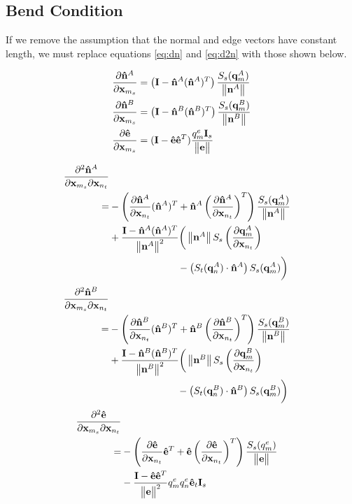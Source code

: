 \documentclass[twocolumn]{article}
\newcommand{\twocolumnonly}[1]{#1}
\newcommand{\twocolbreak}{\twocolumnonly{\notag \\}}
\newcommand{\twocolbreakal}{\twocolumnonly{\notag \\&}}
\newcommand{\norm}[1]{\begin{Vmatrix}#1\end{Vmatrix}}
\newcommand{\pfrac}[2]{
    \frac{\partial #1}{\partial #2}
}
\newcommand{\pfractwo}[3]{
    \frac{\partial^2 #1}{\partial #2 \partial #3}
}
\newcommand{\I}{{\bf I}}
\newcommand{\Is}{{\bf I}_s}
\newcommand{\x}{{\bf x}}
\newcommand{\xms}{\x_{m_s}}
\newcommand{\xnt}{\x_{n_t}}
\newcommand{\n}{{\bf n}}
\newcommand{\nhat}{{\bf {\hat n}}}
\newcommand{\e}{{\bf e}}
\newcommand{\ehat}{{\bf {\hat e}}}
\newcommand{\q}{{\bf q}}
\begin{document}
\subsection{Bend Condition}

If we remove the assumption that the normal and edge vectors have constant
length, we must replace equations \eqref{eq:dn} and \eqref{eq:d2n} with
those shown below.

\begin{align}
\pfrac{\nhat^A}{\xms} &= \left(\I - \nhat^A(\nhat^A)^T\right)
   \frac{ S_s( \q^A_m ) }{ \norm{\n^A} } \\
%
\pfrac{\nhat^B}{\xms} &= \left(\I - \nhat^B(\nhat^B)^T\right)
   \frac{ S_s( \q^B_m ) }{ \norm{\n^B} } \\
%
\pfrac{\ehat}{\xms} &= (\I - \ehat\ehat^T)
   \frac{ q^e_m \Is }{ \norm{\e} }
\end{align}

\newcommand{\rjust}{\twocolumnonly{\notag \\&\quad\quad\quad\quad\quad\quad\quad}}
\begin{align}
\pfractwo{\nhat^A}{\xms}{\xnt} \twocolbreak
=&
- \left(
     \pfrac{\nhat^A}{\xnt} (\nhat^A)^T +
     \nhat^A \left( \pfrac{\nhat^A}{\xnt} \right)^T
  \right) \frac{S_s(\q^A_m)}{\norm{\n^A}}     \notag \\& +
  \frac{\I - \nhat^A(\nhat^A)^T}{\norm{\n^A}^2}
  \bigg(
     \norm{\n^A} S_s\left( \pfrac{\q^A_m}{\xnt} \right) \rjust -
     \left( S_t(\q^A_n) \cdot \nhat^A \right) S_s(\q^A_m)
  \bigg) \twocolbreak
\end{align}
\begin{align}
\pfractwo{\nhat^B}{\xms}{\xnt} \twocolbreak
=&
- \left(
     \pfrac{\nhat^B}{\xnt} (\nhat^B)^T +
     \nhat^B \left( \pfrac{\nhat^B}{\xnt} \right)^T
  \right) \frac{S_s(\q^B_m)}{\norm{\n^B}}     \notag \\& +
  \frac{\I - \nhat^B(\nhat^B)^T}{\norm{\n^B}^2}
  \bigg(
     \norm{\n^B} S_s\left( \pfrac{\q^B_m}{\xnt} \right) \rjust -
     \left( S_t(\q^B_n) \cdot \nhat^B \right) S_s(\q^B_m)
  \bigg) \twocolbreak
\end{align}
\begin{align}
\pfractwo{\ehat}{\xms}{\xnt} \twocolbreak
=&
- \left(
     \pfrac{\ehat}{\xnt} \ehat^T +
     \ehat \left( \pfrac{\ehat}{\xnt} \right)^T
  \right) \frac{S_s(q^e_m)}{\norm{\e}} \twocolbreakal-
  \frac{\I - \ehat\ehat^T}{\norm{\e}^2}
     q^e_m q^e_n \ehat_t \Is
\end{align}
\end{document}
